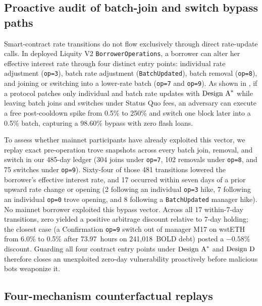 \subsection{Proactive audit of batch-join and switch bypass paths}\label{subsec:batch_transitions}

Smart-contract rate transitions do not flow exclusively through direct rate-update calls. In deployed Liquity V2 \texttt{BorrowerOperations}, a borrower can alter her effective interest rate through four distinct entry points: individual rate adjustment (\texttt{op=3}), batch rate adjustment (\texttt{BatchUpdated}), batch removal (\texttt{op=8}), and joining or switching into a lower-rate batch (\texttt{op=7} and \texttt{op=9}). As shown in \citet{companion2026}, if a protocol patches only individual and batch rate updates with $\text{Design A}^*$ while leaving batch joins and switches under Status Quo fees, an adversary can execute a free post-cooldown spike from 0.5\% to 250\% and switch one block later into a 0.5\% batch, capturing a 98.60\% bypass with zero flash loans.

To assess whether mainnet participants have already exploited this vector, we replay exact pre-operation trove snapshots across every batch join, removal, and switch in our 485-day ledger (304 joins under \texttt{op=7}, 102 removals under \texttt{op=8}, and 75 switches under \texttt{op=9}). Sixty-four of those 481 transitions lowered the borrower's effective interest rate, and 17 occurred within seven days of a prior upward rate change or opening (2 following an individual \texttt{op=3} hike, 7 following an individual \texttt{op=0} trove opening, and 8 following a \texttt{BatchUpdated} manager hike). No mainnet borrower exploited this bypass vector. Across all 17 within-7-day transitions, zero yielded a positive arbitrage discount relative to 7-day holding; the closest case (a Confirmation \texttt{op=9} switch out of manager M17 on wstETH from 6.0\% to 0.5\% after 73.97~hours on 241,018~BOLD debt) posted a $-0.58\%$ discount. Guarding all four contract entry points under $\text{Design A}^*$ and $\text{Design D}$ therefore closes an unexploited zero-day vulnerability proactively before malicious bots weaponize it.

\subsection{Four-mechanism counterfactual replays}\label{subsec:replays}

